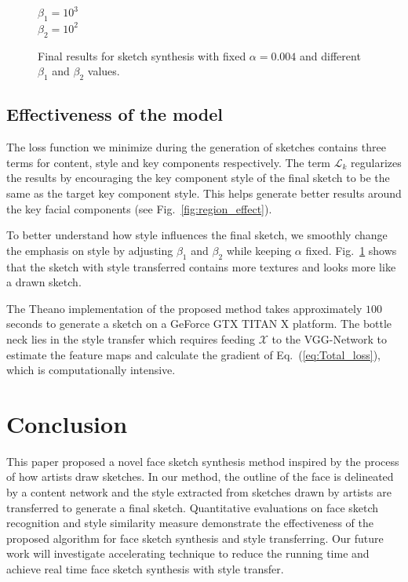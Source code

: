 \documentclass[10pt,twocolumn,letterpaper]{article}
\begin{document}
\begin{figure}[htbp]
\begin{minipage}[t]{0.16\linewidth}
$\beta_1  = 10^{3} $\\
$\beta_2  = 10^{2} $
\end{minipage}
\caption{Final results for sketch synthesis with fixed $\alpha=0.004$ and different $\beta_1$ and $\beta_2$ values.}
\label{fig:alphg_effect}
\end{figure}

\subsection{Effectiveness of the model}

The loss function we minimize during the generation of sketches contains three terms for content, style and key components respectively. The term $\mathcal{L}_{k} $ regularizes the results by encouraging the key component style of the final sketch to be the same as the target key component style. This helps generate better results around the key facial components (see Fig.~\ref{fig:region_effect}). 

To better understand how style influences the final sketch, we smoothly change the emphasis on style by adjusting $\beta_1$ and $\beta_2$ while keeping $\alpha$  fixed. Fig.~\ref{fig:alphg_effect} shows that the sketch with style transferred contains more textures and looks more like a drawn sketch.

The Theano implementation of the proposed method takes approximately $100$ seconds to generate a sketch on a GeForce GTX TITAN X platform. The bottle neck lies in the style transfer which requires feeding $\mathcal{X}$ to the VGG-Network to estimate the feature maps and calculate the gradient of Eq.~(\ref{eq:Total_loss}), which is computationally intensive. 

\section{Conclusion}

This paper proposed a novel face sketch synthesis method inspired by the process of how artists draw sketches. In our method, the outline of the face is delineated by a content network and the style extracted from sketches drawn by artists are transferred to generate a final sketch. Quantitative evaluations on face sketch recognition and style similarity measure demonstrate the effectiveness of the proposed algorithm for face sketch synthesis and style transferring. Our future work will investigate accelerating technique to reduce the running time and achieve real time face sketch synthesis with style transfer.


{\small


}
\end{document}
